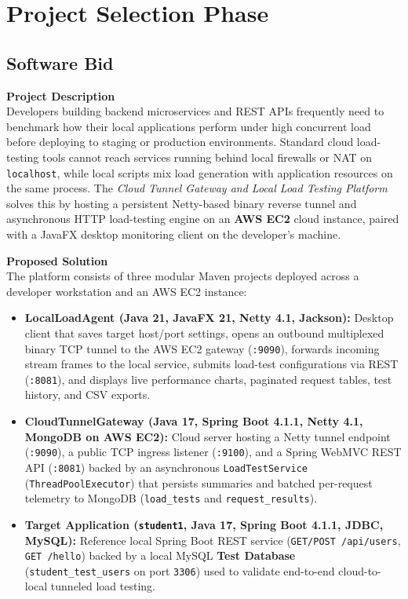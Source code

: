 \documentclass[11pt,a4paper]{report}
\begin{document}
\chapter{Project Selection Phase}

\section{Software Bid}

\textbf{Project Description}\\
Developers building backend microservices and REST APIs frequently need to benchmark how their local applications perform under high concurrent load before deploying to staging or production environments. Standard cloud load-testing tools cannot reach services running behind local firewalls or NAT on \texttt{localhost}, while local scripts mix load generation with application resources on the same process. The \textit{Cloud Tunnel Gateway and Local Load Testing Platform} solves this by hosting a persistent Netty-based binary reverse tunnel and asynchronous HTTP load-testing engine on an \textbf{AWS EC2} cloud instance, paired with a JavaFX desktop monitoring client on the developer's machine.

\textbf{Proposed Solution}\\
The platform consists of three modular Maven projects deployed across a developer workstation and an AWS EC2 instance:
\begin{itemize}
  \item \textbf{LocalLoadAgent (Java 21, JavaFX 21, Netty 4.1, Jackson):} Desktop client that saves target host/port settings, opens an outbound multiplexed binary TCP tunnel to the AWS EC2 gateway (\texttt{:9090}), forwards incoming stream frames to the local service, submits load-test configurations via REST (\texttt{:8081}), and displays live performance charts, paginated request tables, test history, and CSV exports.
  \item \textbf{CloudTunnelGateway (Java 17, Spring Boot 4.1.1, Netty 4.1, MongoDB on AWS EC2):} Cloud server hosting a Netty tunnel endpoint (\texttt{:9090}), a public TCP ingress listener (\texttt{:9100}), and a Spring WebMVC REST API (\texttt{:8081}) backed by an asynchronous \texttt{LoadTestService} (\texttt{ThreadPoolExecutor}) that persists summaries and batched per-request telemetry to MongoDB (\texttt{load\_tests} and \texttt{request\_results}).
  \item \textbf{Target Application (\texttt{student1}, Java 17, Spring Boot 4.1.1, JDBC, MySQL):} Reference local Spring Boot REST service (\texttt{GET/POST /api/users}, \texttt{GET /hello}) backed by a local MySQL \textbf{Test Database} (\texttt{student\_test\_users} on port \texttt{3306}) used to validate end-to-end cloud-to-local tunneled load testing.
\end{itemize}
\end{document}
